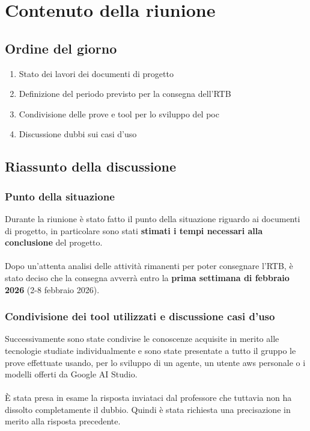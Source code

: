 \documentclass[a4paper, 11pt]{article}
\begin{document}
\section{Contenuto della riunione}

\subsection{Ordine del giorno}
\begin{enumerate}
    \item Stato dei lavori dei documenti di progetto
    \item Definizione del periodo previsto per la consegna dell'RTB
    \item Condivisione delle prove e tool per lo sviluppo del poc
    \item Discussione dubbi sui casi d'uso
\end{enumerate}

\newpage

\subsection{Riassunto della discussione}
\subsubsection{Punto della situazione}
Durante la riunione è stato fatto il punto della situazione riguardo ai documenti di progetto, in particolare sono stati \textbf{stimati i tempi necessari alla conclusione} del progetto.\\
\\
Dopo un'attenta analisi delle attività rimanenti per poter consegnare l'RTB, è stato deciso che la consegna avverrà entro la \textbf{prima settimana di febbraio 2026} (2-8 febbraio 2026).\\

\subsubsection{Condivisione dei tool utilizzati e discussione casi d'uso}
Successivamente sono state condivise le conoscenze acquisite in merito alle tecnologie studiate individualmente e sono state presentate a tutto il gruppo le prove effettuate usando, per lo sviluppo di un agente, un utente aws personale o i modelli offerti da Google AI Studio.\\
\\
È stata presa in esame la risposta inviataci dal professore che tuttavia non ha dissolto completamente il dubbio. Quindi è stata richiesta una precisazione in merito alla risposta precedente.
\end{document}
